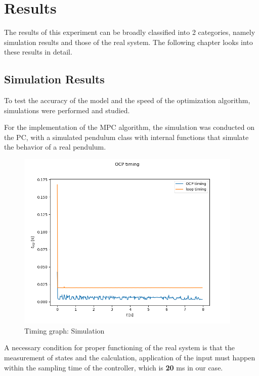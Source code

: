 \chapter{Results}\label{chap:fourth chapter}

The results of this experiment can be broadly classified into 2 categories, namely simulation results and those of the real system. The following chapter looks into these results in detail.


\section{Simulation Results}

To test the accuracy of the model and the speed of the optimization algorithm, simulations were performed and studied.

For the implementation of the MPC algorithm, the simulation was conducted on the PC, with a simulated pendulum class with internal functions that simulate the behavior of a real pendulum. 

\begin{figure}[H]
	\centering
	\includegraphics[width=0.96\textwidth]{"src/Images/OCP_Timing_Graph_Pendulum_Simulation.png"}
	\caption{Timing graph: Simulation}
	\label{fig:Timing: Pendulum simulation}
\end{figure}

A necessary condition for proper functioning of the real system is that the measurement of states and the calculation, application of the input must happen within the sampling time of the controller, which is \textbf{20} ms in our case. 


